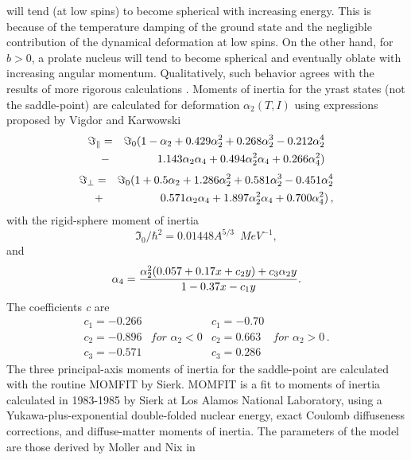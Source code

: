 will tend (at low spins) to become spherical with increasing energy. This is
because of the temperature damping of the ground state and the negligible
contribution of the dynamical deformation at low spins. On the other hand, for
$b>0$, a prolate nucleus will tend to become spherical and eventually oblate
with increasing angular momentum. Qualitatively, such behavior agrees with
the results of more rigorous calculations \cite{and76}. Moments of
inertia for the yrast states (not the saddle-point) are calculated for
deformation $\alpha_{2}(T,I)$ using expressions proposed by Vigdor and
Karwowski \cite{VK}
\begin{eqnarray}
\Im_{\parallel}& =& \Im_{0}(1-\alpha_{2}+0.429\alpha_{2}^{2}+0.268%
\alpha_{2}^{3}-0.212\alpha_{2}^{4}  \notag \\
 & - & 1.143\alpha_{2}\alpha_{4}+0.494\alpha_{2}^{2}\alpha_{4}+0.266\alpha_{4}^{2})
\label{MOMpar}
\end{eqnarray}
\begin{eqnarray}
\Im_{\perp} &=&\Im_{0}(1+0.5\alpha_{2}+1.286\alpha_{2}^{2}+0.581%
\alpha_{2}^{3}-0.451\alpha_{2}^{4}  \notag \\
&+& 0.571\alpha_{2}\alpha_{4}+1.897\alpha_{2}^{2}\alpha_{4}+0.700\alpha_{4}^{2})\,,
\label{MOMort}
\end{eqnarray}
with the rigid-sphere moment of inertia
\begin{equation}
\Im_{0}/\hbar^{2}=0.01448A^{5/3}\,\,\, MeV^{-1},
\end{equation}
and
\begin{equation}
\alpha_{4}=\frac{\alpha_{2}^{2}(0.057+0.17x+c_{2}y)+c_{3}\alpha_{2}y}{%
1-0.37x-c_{1}y}.
\end{equation}
The coefficients \emph{c} are
\begin{equation}
\begin{array}{llll}
c_{1}=-0.266 &  & c_{1}=-0.70 &  \\
c_{2}=-0.896 & for\,\,\alpha_{2}<0 & c_{2}=0.663 & for\,\,\alpha_{2}>0\,. \\
c_{3}=-0.571 &  & c_{3}=0.286 &
\end{array}%
\end{equation}
The three principal-axis moments of inertia for the saddle-point are
calculated with the routine MOMFIT \cite{sierk} by Sierk. MOMFIT is a fit to
moments of inertia calculated in 1983-1985 by Sierk at Los Alamos National
Laboratory, using a Yukawa-plus-exponential double-folded nuclear energy,
exact Coulomb diffuseness corrections, and diffuse-matter moments of
inertia. The parameters of the model are those derived by Moller and Nix in
